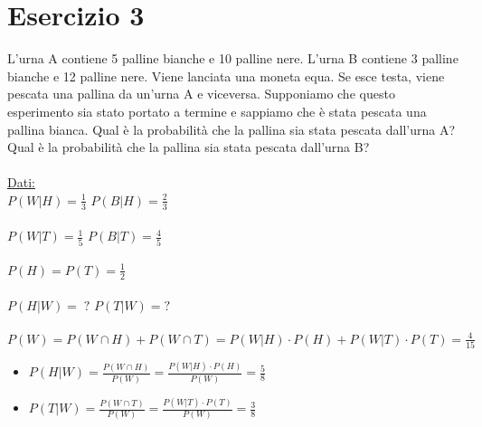 \documentclass{article}
\begin{document}
\section*{Esercizio 3}
L'urna A contiene 5 palline bianche e 10 palline nere. L'urna B contiene 3 palline bianche e 12 palline nere. Viene lanciata una moneta equa. Se esce testa, viene pescata una pallina da un'urna A e viceversa. Supponiamo che questo esperimento sia stato portato a termine e sappiamo che è stata pescata una pallina bianca. Qual è la probabilità che la pallina sia stata pescata dall'urna A? Qual è la probabilità che la pallina sia stata pescata dall'urna B?\\
\\
\underline{Dati:}\\
$P(W|H) = \frac{1}{3}$ \hspace{10mm} $P(B|H) = \frac{2}{3}$\\ \\
$P(W|T) = \frac{1}{5}$ \hspace{10mm} $P(B|T) = \frac{4}{5}$\\ \\
$P(H)=P(T) = \frac{1}{2}$\\ \\
$P(H|W) = \; ?$ \hspace{10mm} $P(T|W) = ?$\\
\\
$P(W) = P(W \cap H) + P(W \cap T) = P(W|H)\cdot P(H) +  P(W|T)\cdot P(T) = \frac{4}{15}$
\begin{itemize}
\item $P(H|W) = \frac{P(W \cap H)}{P(W)} = \frac{P(W|H)\cdot P(H)}{P(W)} = \frac{5}{8}$
\item $P(T|W) = \frac{P(W \cap T)}{P(W)} = \frac{P(W|T)\cdot P(T)}{P(W)} = \frac{3}{8}$
\end{itemize}
\end{document}
